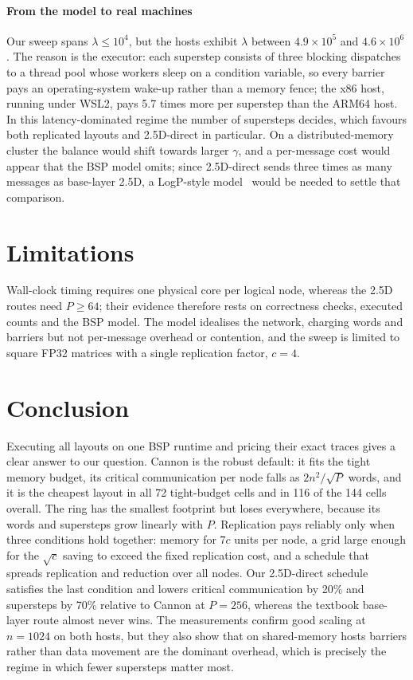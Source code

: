 \documentclass[11pt,a4paper]{article}
\begin{document}
\paragraph{From the model to real machines}
Our sweep spans $\lambda\le10^4$, but the hosts exhibit $\lambda$ between $4.9\times10^5$ and
$4.6\times10^6$. The reason is the executor: each superstep consists of three blocking dispatches to a
thread pool whose workers sleep on a condition variable, so every barrier pays an operating-system wake-up
rather than a memory fence; the x86 host, running under WSL2, pays 5.7 times more per superstep than the
ARM64 host. In this latency-dominated regime
the number of supersteps decides, which favours both replicated layouts and 2.5D-direct in particular. On
a distributed-memory cluster the balance would shift towards larger $\gamma$, and a per-message cost would
appear that the BSP model omits; since 2.5D-direct sends three times as many messages as base-layer 2.5D,
a LogP-style model~\cite{culler1993} would be needed to settle that comparison.

\section{Limitations}
\label{sec:limits}

Wall-clock timing requires one physical core per logical node, whereas the 2.5D routes need $P\ge64$;
their evidence therefore rests on correctness checks, executed counts and the BSP model. The model idealises the network, charging words and barriers but not per-message
overhead or contention, and the sweep is limited to square FP32 matrices with a single replication factor,
$c=4$.

\section{Conclusion}
\label{sec:conclusion}

Executing all layouts on one BSP runtime and pricing their exact traces gives a clear answer to our
question. Cannon is the robust default: it fits the tight memory budget, its critical communication per
node falls as $2n^2/\sqrt P$ words, and it is the cheapest layout in all 72 tight-budget cells and in 116
of the 144 cells overall. The ring has the smallest footprint but loses everywhere, because its words and
supersteps grow linearly with $P$. Replication pays reliably only when three conditions hold together: memory for
$7c$ units per node, a grid large enough for the $\sqrt c$ saving to exceed the fixed replication cost, and
a schedule that spreads replication and reduction over all nodes. Our 2.5D-direct schedule satisfies the
last condition and lowers critical communication by 20\% and supersteps by 70\% relative to Cannon at
$P=256$, whereas the textbook base-layer route almost never wins. The measurements confirm good scaling at
$n=1024$ on both hosts, but they also show that on shared-memory hosts barriers rather than data movement
are the dominant overhead, which is precisely the regime in which fewer supersteps matter most.
\end{document}
